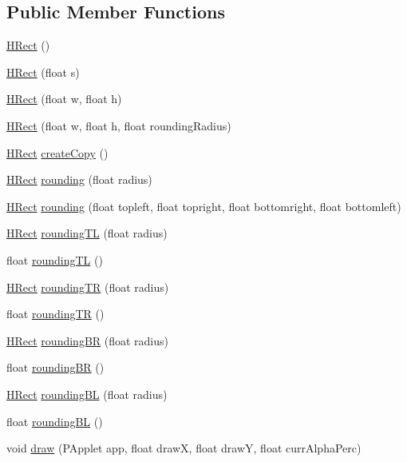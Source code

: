 \subsection*{Public Member Functions}
\begin{DoxyCompactItemize}
\item 
\hyperlink{classhype_1_1drawable_1_1_h_rect_a852cba433ba3c32ee9c2eff8517194be}{H\-Rect} ()
\item 
\hyperlink{classhype_1_1drawable_1_1_h_rect_a919b2296fa3e20e697beab3793991b61}{H\-Rect} (float s)
\item 
\hyperlink{classhype_1_1drawable_1_1_h_rect_a2d8a05687abe254f2f3acc00c07a315c}{H\-Rect} (float w, float h)
\item 
\hyperlink{classhype_1_1drawable_1_1_h_rect_ad54b4ba53618a7cca904ab7655344b12}{H\-Rect} (float w, float h, float rounding\-Radius)
\item 
\hyperlink{classhype_1_1drawable_1_1_h_rect}{H\-Rect} \hyperlink{classhype_1_1drawable_1_1_h_rect_a0a7755f887098c94cff922e8230cad65}{create\-Copy} ()
\item 
\hyperlink{classhype_1_1drawable_1_1_h_rect}{H\-Rect} \hyperlink{classhype_1_1drawable_1_1_h_rect_a603f506e1589c28db3f0a95d20cdd939}{rounding} (float radius)
\item 
\hyperlink{classhype_1_1drawable_1_1_h_rect}{H\-Rect} \hyperlink{classhype_1_1drawable_1_1_h_rect_a8f58251d67b64ad7b6303281cfbb0b0f}{rounding} (float topleft, float topright, float bottomright, float bottomleft)
\item 
\hyperlink{classhype_1_1drawable_1_1_h_rect}{H\-Rect} \hyperlink{classhype_1_1drawable_1_1_h_rect_a161506ef0aa92d72dfac64a03f754c78}{rounding\-T\-L} (float radius)
\item 
float \hyperlink{classhype_1_1drawable_1_1_h_rect_a765e79a1a12db4eadee8d04c2f6dc779}{rounding\-T\-L} ()
\item 
\hyperlink{classhype_1_1drawable_1_1_h_rect}{H\-Rect} \hyperlink{classhype_1_1drawable_1_1_h_rect_a45caa227a5f1d8d5c81b534ebed047e0}{rounding\-T\-R} (float radius)
\item 
float \hyperlink{classhype_1_1drawable_1_1_h_rect_a7c79febd61c038934a1b8018f519ccda}{rounding\-T\-R} ()
\item 
\hyperlink{classhype_1_1drawable_1_1_h_rect}{H\-Rect} \hyperlink{classhype_1_1drawable_1_1_h_rect_a4a1cacf3d57d913d12bb556995f12892}{rounding\-B\-R} (float radius)
\item 
float \hyperlink{classhype_1_1drawable_1_1_h_rect_a096f9a60d0654c3fc05d51d5741b917e}{rounding\-B\-R} ()
\item 
\hyperlink{classhype_1_1drawable_1_1_h_rect}{H\-Rect} \hyperlink{classhype_1_1drawable_1_1_h_rect_a52eda9ea544fe6feb1eeef50ac8d03e4}{rounding\-B\-L} (float radius)
\item 
float \hyperlink{classhype_1_1drawable_1_1_h_rect_a049a529b6800428757a8211107096ef6}{rounding\-B\-L} ()
\item 
void \hyperlink{classhype_1_1drawable_1_1_h_rect_af7407651343cf3b7b5e734d4b2f874c2}{draw} (P\-Applet app, float draw\-X, float draw\-Y, float curr\-Alpha\-Perc)
\end{DoxyCompactItemize}
